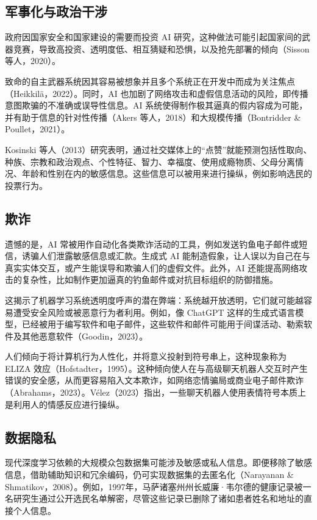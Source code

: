 \subsection{军事化与政治干涉}
政府因国家安全和国家建设的需要而投资 AI 研究，这种做法可能引起国家间的武器竞赛，导致高投资、透明度低、相互猜疑和恐惧，以及抢先部署的倾向（Sisson 等人，2020）。

致命的自主武器系统因其容易被想象并且多个系统正在开发中而成为关注焦点（Heikkilä，2022）。同时，AI 也加剧了网络攻击和虚假信息活动的风险，即传播意图欺骗的不准确或误导性信息。AI 系统使得制作极其逼真的假内容成为可能，并有助于信息的针对性传播（Akers 等人，2018）和大规模传播（Bontridder \& Poullet，2021）。

Kosinski 等人（2013）研究表明，通过社交媒体上的“点赞”就能预测包括性取向、种族、宗教和政治观点、个性特征、智力、幸福度、使用成瘾物质、父母分离情况、年龄和性别在内的敏感信息。这些信息可以被用来进行操纵，例如影响选民的投票行为。

\subsection{欺诈}
遗憾的是，AI 常被用作自动化各类欺诈活动的工具，例如发送钓鱼电子邮件或短信，诱骗人们泄露敏感信息或汇款。生成式 AI 能制造假象，让人误以为自己在与真实实体交互，或产生能误导和欺骗人们的虚假文件。此外，AI 还能提高网络攻击的复杂性，比如制作更加逼真的钓鱼邮件或对抗目标组织的防御措施。

这揭示了机器学习系统透明度呼声的潜在弊端：系统越开放透明，它们就可能越容易遭受安全风险或被恶意行为者利用。例如，像 ChatGPT 这样的生成式语言模型，已经被用于编写软件和电子邮件，这些软件和邮件可能用于间谍活动、勒索软件及其他恶意软件（Goodin，2023）。

人们倾向于将计算机行为人性化，并将意义投射到符号串上，这种现象称为 ELIZA 效应（Hofstadter，1995）。这种倾向使人在与高级聊天机器人交互时产生错误的安全感，从而更容易陷入文本欺诈，如网络恋情骗局或商业电子邮件欺诈（Abrahams，2023）。Vélez（2023）指出，一些聊天机器人使用表情符号本质上是利用人的情感反应进行操纵。

\subsection{数据隐私}
现代深度学习依赖的大规模众包数据集可能涉及敏感或私人信息。即便移除了敏感信息，借助辅助知识和冗余编码，仍可实现数据集的去匿名化（Narayanan \& Shmatikov，2008）。例如，1997年，马萨诸塞州州长威廉·韦尔德的健康记录被一名研究生通过公开选民名单解密，尽管这些记录已删除了诸如患者姓名和地址的直接个人信息。

